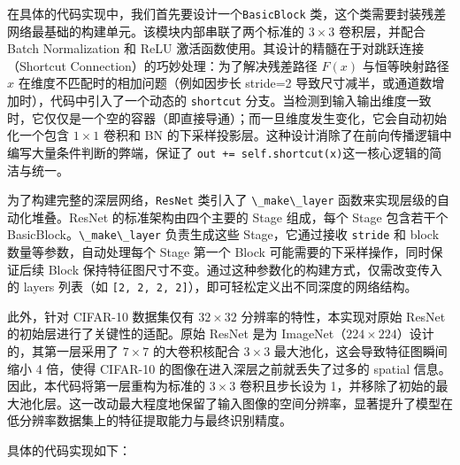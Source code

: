 在具体的代码实现中，我们首先要设计一个\passthrough{\lstinline!BasicBlock!}
类，这个类需要封装残差网络最基础的构建单元。该模块内部串联了两个标准的
\(3\times3\) 卷积层，并配合 Batch Normalization 和 ReLU
激活函数使用。其设计的精髓在于对跳跃连接（Shortcut
Connection）的巧妙处理：为了解决残差路径 \(F(x)\) 与恒等映射路径 \(x\)
在维度不匹配时的相加问题（例如因步长 stride=2
导致尺寸减半，或通道数增加时），代码中引入了一个动态的
\passthrough{\lstinline!shortcut!}
分支。当检测到输入输出维度一致时，它仅仅是一个空的容器（即直接导通）；而一旦维度发生变化，它会自动初始化一个包含
\(1\times1\) 卷积和 BN
的下采样投影层。这种设计消除了在前向传播逻辑中编写大量条件判断的弊端，保证了
\passthrough{\lstinline!out += self.shortcut(x)!}这一核心逻辑的简洁与统一。

为了构建完整的深层网络，\passthrough{\lstinline!ResNet!} 类引入了
\passthrough{\lstinline!\_make\_layer!}
函数来实现层级的自动化堆叠。ResNet 的标准架构由四个主要的 Stage
组成，每个 Stage 包含若干个
BasicBlock。\passthrough{\lstinline!\_make\_layer!} 负责生成这些
Stage，它通过接收 \passthrough{\lstinline!stride!} 和 block
数量等参数，自动处理每个 Stage 第一个 Block
可能需要的下采样操作，同时保证后续 Block
保持特征图尺寸不变。通过这种参数化的构建方式，仅需改变传入的 layers
列表（如
\passthrough{\lstinline![2, 2, 2, 2]!}），即可轻松定义出不同深度的网络结构。

此外，针对 CIFAR-10 数据集仅有 \(32\times32\) 分辨率的特性，本实现对原始
ResNet 的初始层进行了关键性的适配。原始 ResNet 是为
ImageNet（\(224\times224\)）设计的，其第一层采用了 \(7\times7\)
的大卷积核配合 \(3\times3\) 最大池化，这会导致特征图瞬间缩小 4 倍，使得
CIFAR-10 的图像在进入深层之前就丢失了过多的 spatial
信息。因此，本代码将第一层重构为标准的 \(3\times3\) 卷积且步长设为
1，并移除了初始的最大池化层。这一改动最大程度地保留了输入图像的空间分辨率，显著提升了模型在低分辨率数据集上的特征提取能力与最终识别精度。

具体的代码实现如下：

